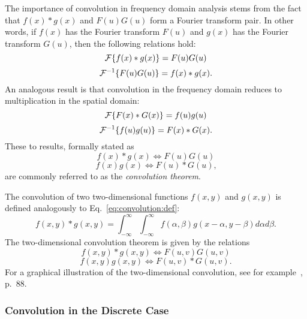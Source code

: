 The importance of convolution in frequency domain analysis stems from
the fact that $f(x)\ast g(x)$ and $F(u)G(u)$ form a Fourier transform
pair.  In other words, if $f(x)$ has the Fourier transform $F(u)$ and
$g(x)$ has the Fourier transform $G(u)$, then the following relations
hold:
\begin{equation}
  {\cal F}\{f(x)\ast g(x)\}=F(u)G(u)
\end{equation}
\begin{equation}
  {\cal F}^{-1}\{F(u)G(u)\}=f(x)\ast g(x)\mbox{.}
\end{equation}
An analogous result is that convolution in the frequency domain
reduces to multiplication in the spatial domain:
\begin{equation}
  {\cal F}\{F(x)\ast G(x)\}=f(u)g(u)
\end{equation}
\begin{equation}
  {\cal F}^{-1}\{f(u)g(u)\}=F(x)\ast G(x)\mbox{.}
\end{equation}
These to results, formally stated as
\begin{equation}
  f(x)\ast g(x)\Leftrightarrow F(u)G(u)
\end{equation}
\begin{equation}
  f(x)g(x)\Leftrightarrow F(u)\ast G(u)\mbox{,}
\end{equation}
are commonly referred to as the {\em convolution theorem\/}.

The convolution of two two-dimensional functions $f(x,y)$ and $g(x,y)$
is defined analogously to Eq.~\ref{eq:convolution:def}:
\begin{equation}
  f(x,y)\ast g(x,y)=\int_{-\infty}^{\infty}\int_{-\infty}^{\infty}
  f(\alpha,\beta)g(x-\alpha,y-\beta)d\alpha d\beta\mbox{.}
\end{equation}
The two-dimensional convolution theorem is given by the relations
\begin{equation}
\label{eq:convolution:2Da}
  f(x,y)\ast g(x,y)\Leftrightarrow F(u,v)G(u,v)
\end{equation}
\begin{equation}
\label{eq:convolution:2Db}
  f(x,y)g(x,y)\Leftrightarrow F(u,v)\ast G(u,v)\mbox{.}
\end{equation}
For a graphical illustration of the two-dimensional convolution, see
for example~\cite{digim}, p.\ 88.

\subsubsection{Convolution in the Discrete Case}

